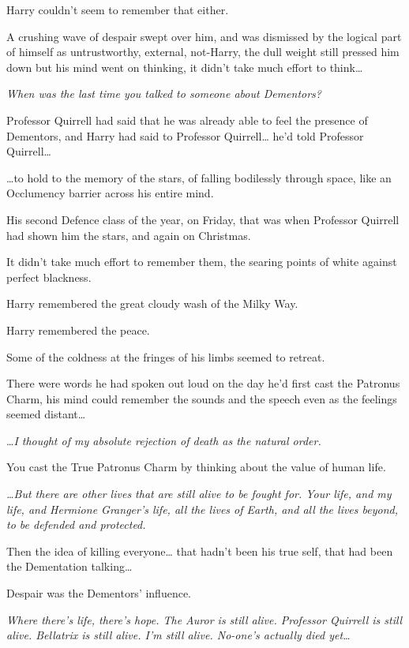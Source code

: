 Harry couldn't seem to remember that either.

A crushing wave of despair swept over him, and was dismissed by the logical part of himself as untrustworthy, external, not-Harry, the dull weight still pressed him down but his mind went on thinking, it didn't take much effort to think{\ldots}

\emph{When was the last time you talked to someone about Dementors?}

Professor Quirrell had said that he was already able to feel the presence of Dementors, and Harry had said to Professor Quirrell{\ldots} he'd told Professor Quirrell{\ldots}

{\ldots}to hold to the memory of the stars, of falling bodilessly through space, like an Occlumency barrier across his entire mind.

His second Defence class of the year, on Friday, that was when Professor Quirrell had shown him the stars, and again on Christmas.

It didn't take much effort to remember them, the searing points of white against perfect blackness.

Harry remembered the great cloudy wash of the Milky Way.

Harry remembered the peace.

Some of the coldness at the fringes of his limbs seemed to retreat.

There were words he had spoken out loud on the day he'd first cast the Patronus Charm, his mind could remember the sounds and the speech even as the feelings seemed distant{\ldots}

{\ldots}\emph{I thought of my absolute rejection of death as the natural order.}

You cast the True Patronus Charm by thinking about the value of human life.

\emph{{\ldots}But there are other lives that are still alive to be fought for. Your life, and my life, and Hermione Granger's life, all the lives of Earth, and all the lives beyond, to be defended and protected.}

Then the idea of killing everyone{\ldots} that hadn't been his true self, that had been the Dementation talking{\ldots}

Despair was the Dementors' influence.

\emph{Where there's life, there's hope. The Auror is still alive. Professor Quirrell is still alive. Bellatrix is still alive. I'm still alive. No-one's actually died yet{\ldots}}


